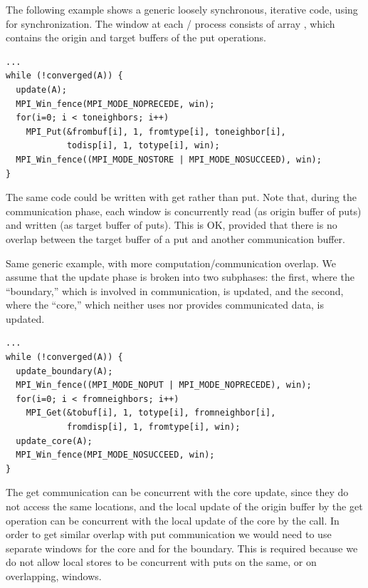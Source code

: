 \begin{example}
\label{ex:1sided-fence}
%
The following example shows a generic loosely synchronous, iterative
code, using  for synchronization.  The window at each \mpi/ process
consists of array , which contains the origin and target buffers of
the
put operations.

\begin{lstlisting}[language={[MPI]C}]
...
while (!converged(A)) {
  update(A);
  MPI_Win_fence(MPI_MODE_NOPRECEDE, win);
  for(i=0; i < toneighbors; i++)
    MPI_Put(&frombuf[i], 1, fromtype[i], toneighbor[i],
            todisp[i], 1, totype[i], win);
  MPI_Win_fence((MPI_MODE_NOSTORE | MPI_MODE_NOSUCCEED), win);
}
\end{lstlisting}
The same code could be written with get rather than put.  Note that,
during the communication phase, each
window is concurrently read  (as origin buffer of puts) and written
(as target buffer of puts).  This is OK, provided that there is no
overlap between the target buffer of a put and another communication 
buffer.
\end{example}

\begin{example}
\label{ex:1sided-split}
%
Same generic example, with more computation/communication overlap.  We
assume that the update phase is broken into two
subphases: the first, 
where the ``boundary,'' which is involved in communication, is updated, and
the second, where the ``core,'' which neither
uses nor provides 
communicated data, is updated.
\begin{lstlisting}[language={[MPI]C}]
...
while (!converged(A)) {
  update_boundary(A);
  MPI_Win_fence((MPI_MODE_NOPUT | MPI_MODE_NOPRECEDE), win);
  for(i=0; i < fromneighbors; i++)
    MPI_Get(&tobuf[i], 1, totype[i], fromneighbor[i],
            fromdisp[i], 1, fromtype[i], win);
  update_core(A);
  MPI_Win_fence(MPI_MODE_NOSUCCEED, win);
}
\end{lstlisting}
The get communication can be concurrent with the core update, since
they do not access the same locations, and the local update of the
origin buffer by the get operation can be concurrent with the local update
of the core by the  call.  In order to get similar
overlap with put communication we would need to use separate windows
for the core and for the boundary.
This is required 
because we do not allow local stores to be concurrent with puts
on the same, or on overlapping, windows.
\end{example}

